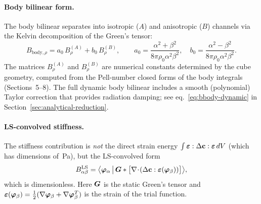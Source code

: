 \paragraph{Body bilinear form.}
The body bilinear separates into isotropic ($A$) and anisotropic ($B$)
channels via the Kelvin decomposition of the Green's tensor:
\begin{equation}
  B_{\text{body},\rho}
  = a_0\,B^{(A)}_\rho + b_0\,B^{(B)}_\rho,
  \qquad
  a_0 = \frac{\alpha^2 + \beta^2}{8\pi\rho_0\alpha^2\beta^2},\quad
  b_0 = \frac{\alpha^2 - \beta^2}{8\pi\rho_0\alpha^2\beta^2}.
  \label{eq:kelvin-ab}
\end{equation}
The matrices $B^{(A)}_\rho$ and $B^{(B)}_\rho$ are numerical constants
determined by the cube geometry, computed from the
Pell-number closed forms of the body integrals (Sections~5--8).
The full dynamic body bilinear includes a smooth (polynomial) Taylor
correction that provides radiation damping; see
eq.~\eqref{eq:bbody-dynamic} in Section~\ref{sec:analytical-reduction}.

\paragraph{LS-convolved stiffness.}
The stiffness contribution is \emph{not} the direct strain energy
$\int\boldsymbol{\varepsilon}:\Delta\mathbf{c}:\boldsymbol{\varepsilon}\,dV$
(which has dimensions of~Pa), but the LS-convolved form
\begin{equation}
  B^{\text{LS}}_{\alpha\beta}
  = \big\langle\bm{\varphi}_\alpha
      \,\big|\, \bm{G} \ast
      \big[\nabla\!\cdot\!(\Delta\mathbf{c}:\bm{\varepsilon}(\bm{\varphi}_\beta))\big]
    \big\rangle,
  \label{eq:bstiff-ls}
\end{equation}
which is dimensionless.  Here $\bm{G}$ is the static Green's tensor and
$\bm{\varepsilon}(\bm{\varphi}_\beta) = \tfrac{1}{2}(\nabla\bm{\varphi}_\beta + \nabla\bm{\varphi}_\beta^T)$
is the strain of the trial function.

